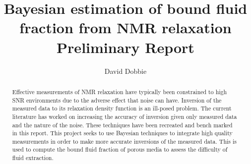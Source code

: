 \documentclass[11pt
              , a4paper
              , twoside
              , openright
              ]{report}
\title{Bayesian estimation of bound fluid fraction from NMR relaxation \\ Preliminary Report}
\author{David Dobbie}
\date{}
\begin{document}
\frontmatter



\begin{abstract}

Effective measurements of NMR relaxation have typically been constrained to high SNR environments due to the adverse effect that noise can have. Inversion of the measured data to its relaxation density function is an ill-posed problem. The current literature has worked on increasing the accuracy of inversion given only measured data and the nature of the noise. These techniques have been recreated and bench marked in this report. This project seeks to use Bayesian techniques to integrate high quality measurements in order to make more accurate inversions of the measured data. This is used to compute the bound fluid fraction of porous  media to assess the difficulty of fluid extraction.
\end{abstract}


\maketitle




\mainmatter












\backmatter




%



\end{document}
